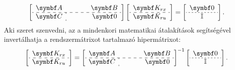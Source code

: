 \bgroup
{}
\def\arraystretch{1.2}
\begin{equation}
  \left[\begin{array}{ c : c }
      \rmat A & \phantom{\rmat A} \hspace{-2.8mm}\rmat B
      \\ \hdashline
      \rmat C & \phantom{\rmat A} \hspace{-2.5mm}\rmat 0
    \end{array}\right]
  \left[\begin{array}{ c }
      \rmat K_{rx}
      \\ \hdashline
      \rmat K_{ru}
    \end{array}\right]
  =
  \left[\begin{array}{ c }
      \rmat 0
      \\ \hdashline[2.25pt/2.25pt]
      \Imat
    \end{array}\right]
  .
\end{equation}
\egroup
Aki szeret szenvedni, az a mindenkori matematikai átalakítások segítségével
invertálhatja a rendszermátrixot tartalmazó hipermátrixot:
\bgroup
{}
\def\arraystretch{1.2}
\begin{equation}
  \left[\begin{array}{ c }
      \rmat K_{rx}
      \\ \hdashline
      \rmat K_{ru}
    \end{array}\right]
  =
  \left[\begin{array}{ c : c }
      \rmat A & \phantom{\rmat A} \hspace{-2.8mm}\rmat B
      \\ \hdashline
      \rmat C & \phantom{\rmat A} \hspace{-2.5mm}\rmat 0
    \end{array}\right]^{-1}
  \left[\begin{array}{ c }
      \rmat 0
      \\ \hdashline[2.25pt/2.25pt]
      \Imat
    \end{array}\right]
  .
\end{equation}
\egroup

\clearpage
